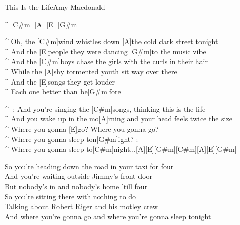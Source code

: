 \begin{song}{This Is the Life}{Amy Macdonald}

\vspace{-0.5cm}
\begin{guitar}
^ [C#m] [A] [E] [G#m]\\
\end{guitar}

\begin{guitar}
^ Oh, the [C#m]wind whistles down [A]the cold dark street tonight \\
^ And the [E]people they were dancing [G#m]to the music vibe \\
^ And the [C#m]boys chase the girls with the curls in their hair \\
^ While the [A]shy tormented youth sit way over there \\
^ And the [E]songs they get louder \\
^ Each one better than be[G#m]fore \\
\end{guitar}


\begin{guitar}
^ |: And you're singing the [C#m]songs, thinking this is the life \\
^ And you wake up in the mo[A]rning and your head feels twice the size \\
^ Where you gonna [E]go? Where you gonna go? \\
^ Where you gonna sleep ton[G#m]ight? :|\\
^ Where you gonna sleep to[C#m]night...[A][E][G#m][C#m][A][E][G#m]\\
\end{guitar}


\begin{guitar}
So you're heading down the road in your taxi for four \\
And you're waiting outside Jimmy's front door \\
But nobody's in and nobody's home 'till four \\
So you're sitting there with nothing to do \\
Talking about Robert Riger and his motley crew \\
And where you're gonna go and where you're gonna sleep tonight \\
\end{guitar}

\end{song}

